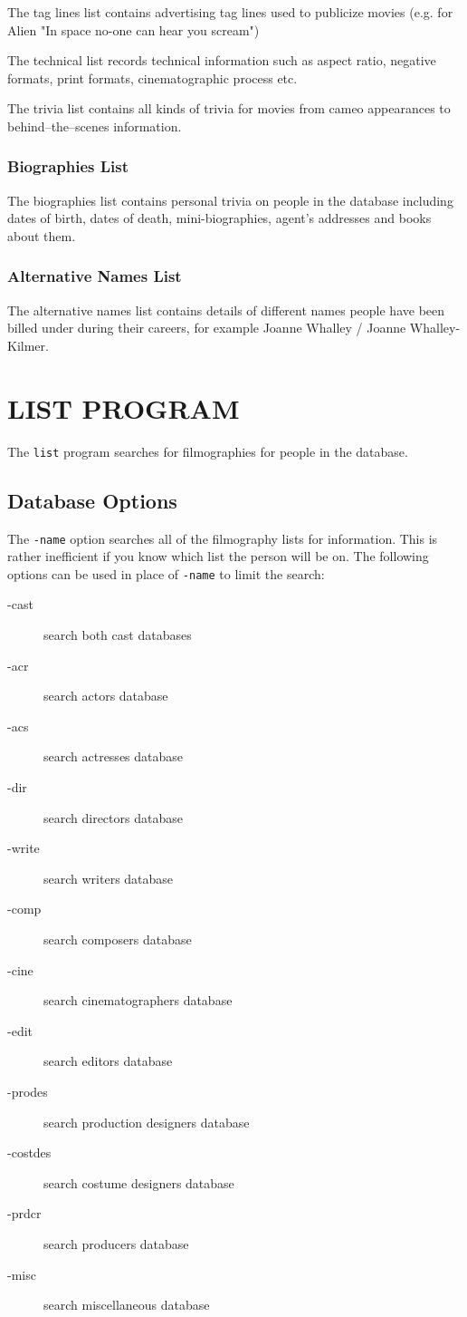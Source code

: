 The tag lines list contains advertising tag lines used to publicize movies 
(e.g. for Alien "In space no-one can hear you scream")

The technical list records technical information such as aspect ratio, 
negative formats, print formats, cinematographic process etc.

The trivia list contains all kinds of trivia for movies from cameo 
appearances
to behind--the--scenes information.

\subsubsection{Biographies List}

The biographies list contains personal trivia on people in the database 
including dates of birth, dates of death, mini-biographies, agent's 
addresses
and books about them.

\subsubsection{Alternative Names List}

The alternative names list contains details of different names people have 
been billed under during their careers, for example Joanne Whalley / Joanne
Whalley-Kilmer.

\clearpage
\section{LIST PROGRAM}

The {\tt list} program searches for filmographies for people in the 
database.

\subsection{Database Options}

The {\tt -name} option searches all of the filmography lists for 
information.
This is rather inefficient if you know which list the person will be on. 
The
following options can be used in place of {\tt -name} to limit the search:
\begin{description}
\item[-cast]  search both cast databases
\item[-acr] search actors database
\item[-acs] search actresses database
\item[-dir]  search directors database
\item[-write]  search writers database
\item[-comp]  search composers database
\item[-cine] search cinematographers database
\item[-edit] search editors database
\item[-prodes] search production designers database
\item[-costdes] search costume designers database
\item[-prdcr] search producers database
\item[-misc] search miscellaneous database
\end{description}
 
